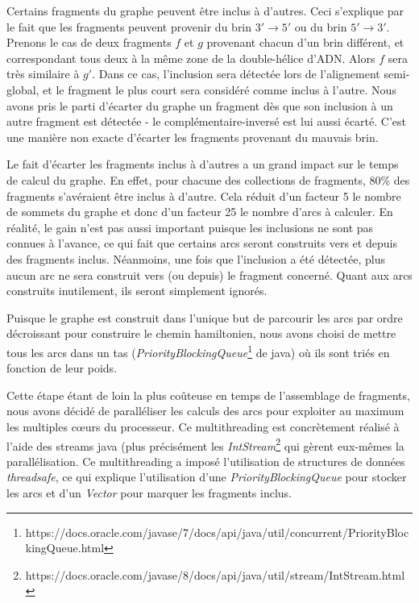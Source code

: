 \documentclass{article}
\begin{document}
Certains fragments du graphe peuvent être inclus à d'autres. Ceci s'explique par le fait que les fragments peuvent provenir du brin $3' \to 5'$ ou du brin $5' \to 3'$. Prenons le cas de deux fragments $f$ et $g$ provenant chacun d'un brin différent, et correspondant tous deux à la même zone de la double-hélice d'ADN. Alors $f$ sera très similaire à $g'$. Dans ce cas, l'inclusion sera détectée lors de l'alignement semi-global, et le fragment le plus court sera considéré comme inclus à l'autre. 
Nous avons pris le parti d'écarter du graphe un fragment dès que son inclusion à un autre fragment est détectée - le complémentaire-inversé est lui aussi écarté. C'est une manière non exacte d'écarter les fragments provenant du mauvais brin.

Le fait d'écarter les fragments inclus à d'autres a un grand impact sur le temps de calcul du graphe. En effet, pour chacune des collections de fragments, 80\% des fragments s'avéraient être inclus à d'autre. Cela réduit d'un facteur 5 le nombre de sommets du graphe et donc d'un facteur 25 le nombre d'arcs à calculer. En réalité, le gain n'est pas aussi important puisque les inclusions ne sont pas connues à l'avance, ce qui fait que certains arcs seront construits vers et depuis des fragments inclus. Néanmoins, une fois que l'inclusion a été détectée, plus aucun arc ne sera construit vers (ou depuis) le fragment concerné. Quant aux arcs construits inutilement, ils seront simplement ignorés.

Puisque le graphe est construit dans l'unique but de parcourir les arcs par ordre décroissant pour construire le chemin hamiltonien, nous avons choisi de mettre tous les arcs dans un tas (\textit{PriorityBlockingQueue}\footnote{https://docs.oracle.com/javase/7/docs/api/java/util/concurrent/PriorityBlockingQueue.html} de java) où ils sont triés en fonction de leur poids. 

Cette étape étant de loin la plus coûteuse en temps de l'assemblage de fragments, nous avons décidé de paralléliser les calculs des arcs pour exploiter au maximum les multiples cœurs du processeur. Ce multithreading est concrètement réalisé à l'aide des streams java (plus précisément les \textit{IntStream}\footnote{https://docs.oracle.com/javase/8/docs/api/java/util/stream/IntStream.html} qui gèrent eux-mêmes la parallélisation. Ce multithreading a imposé l'utilisation de structures de données \textit{threadsafe}, ce qui explique l'utilisation d'une \textit{PriorityBlockingQueue} pour stocker les arcs et d'un \textit{Vector} pour marquer les fragments inclus.
\end{document}
